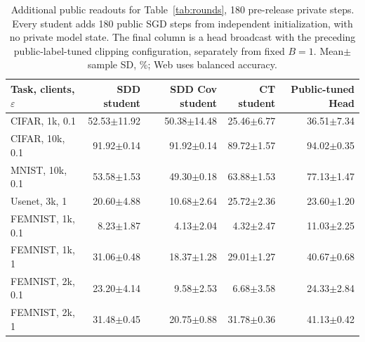 \begin{table}[t]
\caption{Additional public readouts for Table~\ref{tab:rounds}, 180 pre-release private steps. Every student adds 180 public SGD steps from independent initialization, with no private model state. The final column is a head broadcast with the preceding public-label-tuned clipping configuration, separately from fixed $B=1$. Mean$\pm$sample SD, \%; Web uses balanced accuracy.}
\label{tab:round-students}\small
\centering
\begin{tabular}{@{}lrrrr@{}}\toprule
Task, clients, $\varepsilon$ & SDD student & SDD Cov student & CT student & Public-tuned Head \\
\midrule
CIFAR, 1k, 0.1 & 52.53$\pm$11.92 & 50.38$\pm$14.48 & 25.46$\pm$6.77 & 36.51$\pm$7.34 \\
CIFAR, 10k, 0.1 & 91.92$\pm$0.14 & 91.92$\pm$0.14 & 89.72$\pm$1.57 & 94.02$\pm$0.35 \\
MNIST, 10k, 0.1 & 53.58$\pm$1.53 & 49.30$\pm$0.18 & 63.88$\pm$1.53 & 77.13$\pm$1.47 \\
Usenet, 3k, 1 & 20.60$\pm$4.88 & 10.68$\pm$2.64 & 25.72$\pm$2.36 & 23.60$\pm$1.20 \\
FEMNIST, 1k, 0.1 & 8.23$\pm$1.87 & 4.13$\pm$2.04 & 4.32$\pm$2.47 & 11.03$\pm$2.25 \\
FEMNIST, 1k, 1 & 31.06$\pm$0.48 & 18.37$\pm$1.28 & 29.01$\pm$1.27 & 40.67$\pm$0.68 \\
FEMNIST, 2k, 0.1 & 23.20$\pm$4.14 & 9.58$\pm$2.53 & 6.68$\pm$3.58 & 24.33$\pm$2.84 \\
FEMNIST, 2k, 1 & 31.48$\pm$0.45 & 20.75$\pm$0.88 & 31.78$\pm$0.36 & 41.13$\pm$0.42 \\
\bottomrule\end{tabular}
\end{table}
